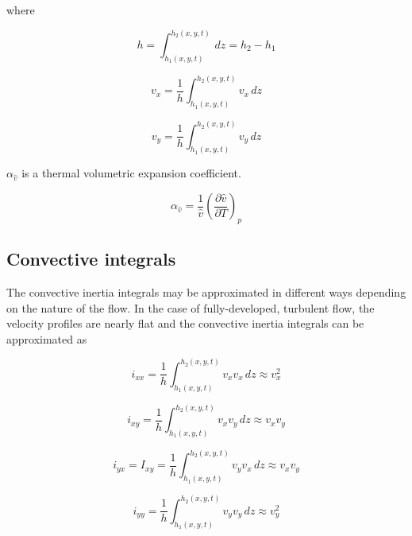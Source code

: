 \documentclass[12pt,letterpaper]{article}
\begin{document}
where

\begin{equation}
h = \int_{h_1(x,y,t)}^{h_2(x,y,t)} \, dz = h_2 - h_1
\end{equation}

\begin{equation}
v_x = \frac{1}{h} \int_{h_1(x,y,t)}^{h_2(x,y,t)} v_x \, dz
\end{equation}

\begin{equation}
v_y = \frac{1}{h} \int_{h_1(x,y,t)}^{h_2(x,y,t)} v_y \, dz
\end{equation}

$\alpha_{\hat{v}}$ is a thermal volumetric expansion coefficient.

\begin{equation}
 \alpha_{\hat{v}} = \frac{1}{\hat{v}}
\left( 
\frac{\partial \hat{v}}{\partial T}
\right)_p
\end{equation}


\subsection{Convective integrals}

The convective inertia integrals may be approximated in different ways depending
on the nature of the flow.  In the case of fully-developed, turbulent
flow, the velocity profiles are nearly flat and the convective inertia
integrals can be approximated as

\begin{equation}
i_{xx} = \frac{1}{h} \int_{h_1(x,y,t)}^{h_2(x,y,t)} v_x v_x \, dz
\approx v_x^2
\end{equation}

\begin{equation}
i_{xy} = \frac{1}{h} \int_{h_1(x,y,t)}^{h_2(x,y,t)} v_x v_y \, dz
\approx v_x v_y
\end{equation}

\begin{equation}
i_{yx} = I_{xy} = \frac{1}{h} \int_{h_1(x,y,t)}^{h_2(x,y,t)} v_y v_x \, dz
\approx v_x v_y
\end{equation}

\begin{equation}
i_{yy} = \frac{1}{h} \int_{h_1(x,y,t)}^{h_2(x,y,t)} v_y v_y \, dz
\approx v_y^2
\end{equation}
\end{document}

